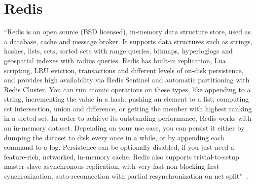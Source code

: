 \section{Redis}

“Redis is an open source (BSD licensed), in-memory data structure store, used
as a database, cache and message broker. It supports data structures such as
strings, hashes, lists, sets, sorted sets with range queries, bitmaps, 
hyperloglogs and geospatial indexes with radius queries. Redis has built-in 
replication, Lua scripting, LRU eviction, transactions and different levels 
of on-disk persistence, and provides high availability via Redis Sentinel and
automatic partitioning with Redis Cluster.
You can run atomic operations on these types, like appending to a string, 
incrementing the value in a hash; pushing an element to a list; computing set
intersection, union and difference, or getting the member with highest 
ranking in a sorted set.
In order to achieve its outstanding performance, Redis works with an in-memory
dataset. Depending on your use case, you can persist it either by dumping the
dataset to disk every once in a while, or by appending each command to a log.
Persistence can be optionally disabled, if you just need a feature-rich, 
networked, in-memory cache.
Redis also supports trivial-to-setup master-slave asynchronous replication, 
with very fast non-blocking first synchronization, auto-reconnection with 
partial resynchronization on net split”~\cite{hid-sp18-520-Redis}.
